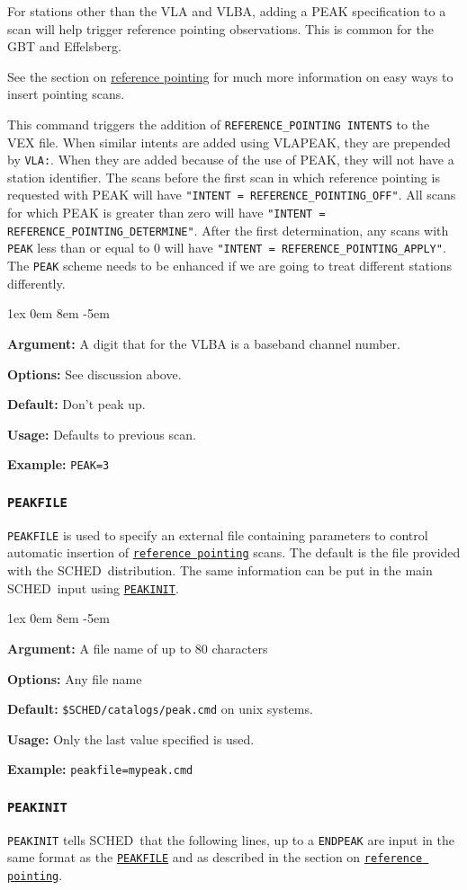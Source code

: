 \documentclass{report}
\newcommand{\schedb}{{\sc SCHED~}}
\newcommand{\rcwbox}[5]{
  \begin{list}{}{\parsep 1ex  \itemsep 0em
                 \leftmargin 8em  \itemindent -5em }
    \item {\bf Argument:} #1
    \item {\bf Options:}  #2
    \item {\bf Default:}  #3
    \item {\bf Usage:}    #4
    \item {\bf Example:}  #5
  \end{list}
}
\begin{document}
For stations other than the VLA and VLBA, adding a PEAK specification
to a scan will help trigger reference pointing observations.  This 
is common for the GBT and Effelsberg.

See the section on 
{\hyperref[SEC:REFPOINT]{reference pointing}} for
much more information on easy ways to insert pointing scans.

This command triggers the addition of {\tt REFERENCE\_POINTING 
INTENTS} to the VEX file.  When similar intents are added using 
VLAPEAK, they are prepended by {\tt VLA:}.  When they are added
because of the use of PEAK, they will not have a station identifier.
The scans before the first scan in which reference pointing is
requested with PEAK will have {\tt "INTENT = REFERENCE\_POINTING\_OFF"}.
All scans for which PEAK is greater than zero will have 
{\tt "INTENT = REFERENCE\_POINTING\_DETERMINE"}.  After the first
determination, any scans with {\tt PEAK} less than or equal to 0 
will have {\tt "INTENT = REFERENCE\_POINTING\_APPLY"}.  The {\tt PEAK}
scheme needs to be enhanced if we are going to treat different 
stations differently.

\rcwbox
{A digit that for the VLBA is a baseband channel number.}
{See discussion above.}
{Don't peak up.}
{Defaults to previous scan.}
{{\tt PEAK=3}}


\subsubsection{\label{MP:PEAKFILE}{\tt PEAKFILE}}

{\tt PEAKFILE} is used to specify an external file containing
parameters to control automatic insertion of 
{\hyperref[SEC:REFPOINT]{{\tt reference pointing}}}
scans.  The default is the file provided
with the \schedb distribution.  The same information can be put
in the main \schedb input using 
{\hyperref[MP:PEAKINIT]{{\tt PEAKINIT}}}.

\rcwbox
{A file name of up to 80 characters}
{Any file name}
{{\tt \$SCHED/catalogs/peak.cmd} on unix systems.}
{Only the last value specified is used.}
{{\tt peakfile=mypeak.cmd}}


\subsubsection{\label{MP:PEAKINIT}{\tt PEAKINIT}}

{\tt PEAKINIT} tells \schedb that the following lines, up to a
{\tt ENDPEAK} are input in the same format as the
{\hyperref[MP:PEAKFILE]{{\tt PEAKFILE}}} and as described in the section on
{\hyperref[SEC:REFPOINT]{{\tt reference pointing}}}.
\end{document}
